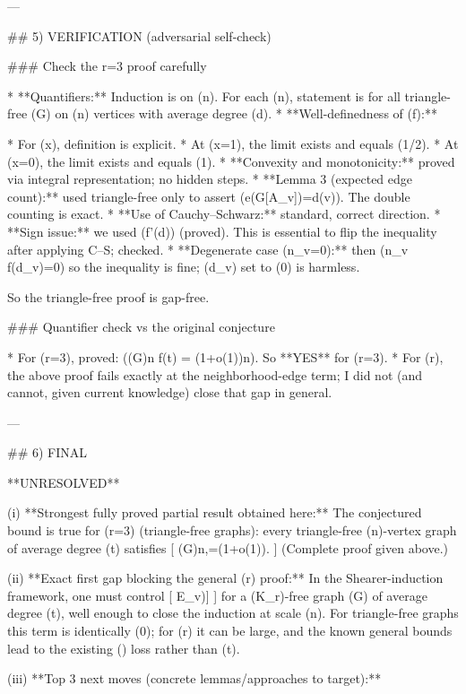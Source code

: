 ---

## 5) VERIFICATION (adversarial self-check)

### Check the r=3 proof carefully

* **Quantifiers:** Induction is on (n). For each (n), statement is for all triangle-free (G) on (n) vertices with average degree (d).
* **Well-definedness of (f):**

  * For (x), definition is explicit.
  * At (x=1), the limit exists and equals (1/2).
  * At (x=0), the limit exists and equals (1).
* **Convexity and monotonicity:** proved via integral representation; no hidden steps.
* **Lemma 3 (expected edge count):** used triangle-free only to assert (e(G[A_v])=d(v)). The double counting is exact.
* **Use of Cauchy–Schwarz:** standard, correct direction.
* **Sign issue:** we used (f'(d)) (proved). This is essential to flip the inequality after applying C–S; checked.
* **Degenerate case (n_v=0):** then (n_v f(d_v)=0) so the inequality is fine; (d_v) set to (0) is harmless.

So the triangle-free proof is gap-free.

### Quantifier check vs the original conjecture

* For (r=3), proved: (\alpha(G)\ge n f(t) = (1+o(1))n). So **YES** for (r=3).
* For (r), the above proof fails exactly at the neighborhood-edge term; I did not (and cannot, given current knowledge) close that gap in general.

---

## 6) FINAL

**UNRESOLVED**

(i) **Strongest fully proved partial result obtained here:**
The conjectured bound is true for (r=3) (triangle-free graphs): every triangle-free (n)-vertex graph of average degree (t) satisfies
[
\alpha(G)\ge n,=(1+o(1)).
]
(Complete proof given above.)

(ii) **Exact first gap blocking the general (r) proof:**
In the Shearer-induction framework, one must control
[
\mathbb E_v\big[e(G[N(v)])\big]
]
for a (K_r)-free graph (G) of average degree (t), well enough to close the induction at scale (n). For triangle-free graphs this term is identically (0); for (r) it can be large, and the known general bounds lead to the existing (\log\log) loss rather than (\log t).

(iii) **Top 3 next moves (concrete lemmas/approaches to target):**

